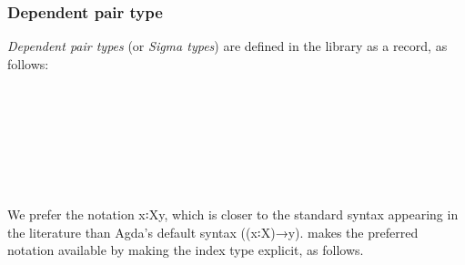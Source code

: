 \subsubsection{Dependent pair type}\label{Preliminaries.sssec:dependent-pair-type}
\textit{Dependent pair types} (or \textit{Sigma types}) are defined in the \typetopology library as a record, as follows:
\ccpad
\begin{code}
\>[0]\AgdaSpace{}%
\AgdaSpace{}%
\AgdaSymbol{\{}\AgdaSpace{}%
\AgdaSymbol{\}}\AgdaSpace{}%
\AgdaSymbol{\{}\AgdaSpace{}%
\AgdaSymbol{:}\AgdaSpace{}%
\AgdaSpace{}%
\AgdaSpace{}%
\AgdaSymbol{\}}\AgdaSpace{}%
\AgdaSymbol{(}\AgdaSpace{}%
\AgdaSymbol{:}\AgdaSpace{}%
\AgdaSpace{}%
\AgdaSpace{}%
\AgdaSpace{}%
\AgdaSpace{}%
\AgdaSymbol{)}\AgdaSpace{}%
\AgdaSymbol{:}\AgdaSpace{}%
\AgdaSpace{}%
\AgdaSpace{}%
\AgdaSpace{}%
%
\>[52]\<%
\\
\>[0][@{}l@{\AgdaIndent{0}}]%
\>[2]\<%
\\
\>[2][@{}l@{\AgdaIndent{0}}]%
\>[3]\AgdaOperator{\AgdaInductiveConstructor{\AgdaUnderscore{},\AgdaUnderscore{}}}\<%
\\
%
\>[2]\<%
\\
\>[2][@{}l@{\AgdaIndent{0}}]%
\>[3]\AgdaSpace{}%
\AgdaSymbol{:}\AgdaSpace{}%
\<%
\\
%
\>[3]\AgdaSpace{}%
\AgdaSymbol{:}\AgdaSpace{}%
\AgdaSpace{}%
\<%
\\
%
\>[0]\AgdaSpace{}%
\AgdaSpace{}%
\AgdaOperator{\AgdaInductiveConstructor{\AgdaUnderscore{},\AgdaUnderscore{}}}\<%
\end{code}
\ccpad
We prefer the notation \ab x꞉\ab X\AgdaComma{}y, which is closer to the standard syntax appearing in the literature than Agda's default syntax ((\ab x꞉\ab X)\as →\ab y). \mhe makes the preferred notation available by making the index type explicit, as follows.
\ccpad
